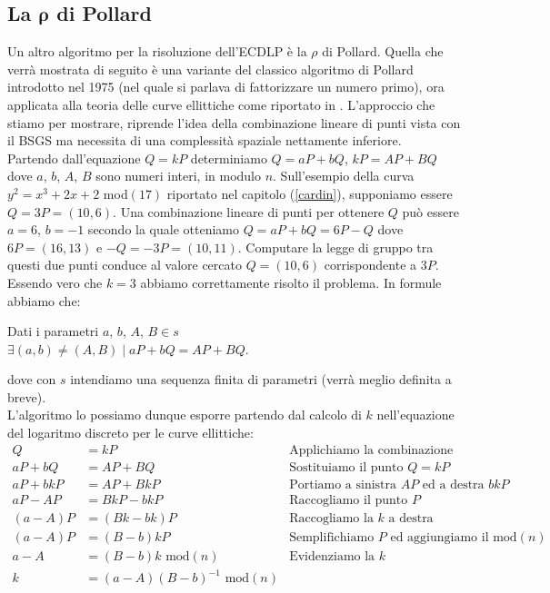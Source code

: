 \documentclass[a4paper,12pt]{tesiinfo}
\begin{document}
\subsection{La \texorpdfstring{$\mathbold{\rho}$}{p} di Pollard}
Un altro algoritmo per la risoluzione dell'ECDLP \`e la $\rho$ di Pollard. Quella che verr\`a mostrata di seguito \`e una variante del classico algoritmo di Pollard introdotto nel 1975 (nel quale si parlava di fattorizzare un numero primo), ora applicata alla teoria delle curve ellittiche come riportato in \cite{parall rho}. L'approccio che stiamo per mostrare, riprende l'idea della combinazione lineare di punti vista con il BSGS ma necessita di una complessit\`a spaziale nettamente inferiore. 
\\
Partendo dall'equazione $Q=kP$ determiniamo $Q=aP + bQ$, $kP=AP + BQ$ dove $a$, $b$, $A$, $B$ sono numeri interi, in modulo $n$. Sull'esempio della curva $y^2=x^3+2x+2$ mod$(17)$ riportato nel capitolo (\ref{cardin}), supponiamo essere $Q=3P=(10, 6)$. Una combinazione lineare di punti per ottenere $Q$ pu\`o essere $a=6$, $b=-1$ secondo la quale otteniamo $Q=aP+bQ=6P-Q$ dove $6P=(16, 13)$ e $-Q=-3P=(10, 11)$. Computare la legge di gruppo tra questi due punti conduce al valore cercato $Q=(10, 6)$ corrispondente a $3P$. Essendo vero che $k=3$ abbiamo correttamente risolto il problema. In formule abbiamo che:
\begin{center}
Dati i parametri $a$, $b$, $A$, $B \in s$\\
 $\exists(a, b) \ne (A, B) \mid aP+bQ = AP+BQ$.
\end{center}
dove con $s$ intendiamo una sequenza finita di parametri (verr\`a meglio definita a breve).
\\
L'algoritmo lo possiamo dunque esporre partendo dal calcolo di $k$ nell'equazione del logaritmo discreto per le curve ellittiche:
\begin{align*}
 Q &=kP &\text{Applichiamo la combinazione lineare}\\
 aP + bQ &= AP + BQ &\text{Sostituiamo il punto }Q = kP\\
 aP + bkP &= AP + BkP &\text{Portiamo a sinistra $AP$ ed a destra $bkP$}\\
 aP -AP &= BkP -bkP &\text{Raccogliamo il punto }P\\
 (a -A)P &= (Bk -bk)P &\text{Raccogliamo la $k$ a destra}\\
 (a -A)P &= (B -b)kP &\text{Semplifichiamo $P$ ed aggiungiamo il mod$(n)$}\\
 a -A &= (B -b)k\text{ mod$(n)$} &\text{Evidenziamo la $k$}\\
 k &= (a -A)(B -b)^{-1}\text{ mod$(n)$}
\end{align*}
\end{document}

